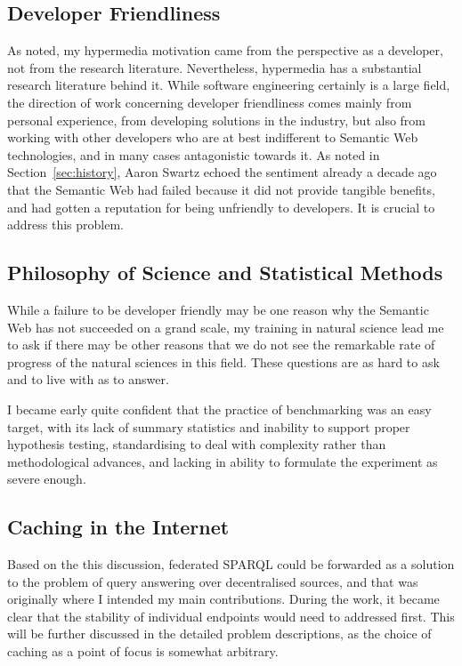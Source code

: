 \subsection{Developer Friendliness}

As noted, my hypermedia motivation came from the perspective as a
developer, not from the research literature. Nevertheless, hypermedia
has a substantial research literature behind it. 
While software engineering certainly is a large field, the 
direction of work concerning developer friendliness comes mainly from
personal experience, from developing solutions in the industry, but
also from working with other developers who are at best indifferent to
Semantic Web technologies, and in many cases antagonistic towards it.
As noted in Section~\ref{sec:history}, Aaron Swartz echoed the
sentiment already a decade ago that the Semantic Web had failed
because it did not provide tangible benefits, and had gotten a
reputation for being unfriendly to developers. It is crucial to
address this problem.


\subsection{Philosophy of Science and Statistical Methods}

While a failure to be developer friendly may be one reason why the
Semantic Web has not succeeded on a grand scale, my training in
natural science lead me to ask if there may be other reasons that we
do not see the remarkable rate of progress of the natural sciences in
this field. These questions are as hard to ask and to live with as to
answer. 

I became early quite confident that the practice of benchmarking was
an easy target, with its lack of summary statistics and inability to
support proper hypothesis testing, standardising to deal with
complexity rather than methodological advances, and lacking in ability to
formulate the experiment as severe enough.

\subsection{Caching in the Internet}\label{sec:motivcache}

Based on the this discussion, federated SPARQL could be forwarded as a 
solution to the problem of query answering over decentralised sources,
and that was originally where I intended my main contributions. During
the work, it became clear that the stability of individual endpoints
would need to addressed first. This will be further discussed in the
detailed problem descriptions, as the choice of caching as a point of
focus is somewhat arbitrary.

